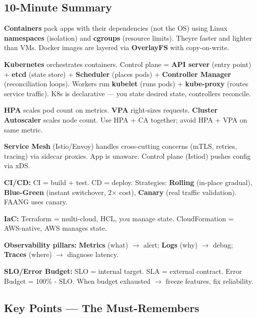 \documentclass[11pt]{article}
\begin{document}
\subsection{10-Minute Summary}\label{10-minute-summary}

\textbf{Containers} pack apps with their dependencies (not the OS) using Linux \textbf{namespaces} (isolation) and \textbf{cgroups} (resource limits). They\textquotesingle re faster and lighter than VMs. Docker images are layered via \textbf{OverlayFS} with copy-on-write.

\textbf{Kubernetes} orchestrates containers. Control plane = \textbf{API server} (entry point) + \textbf{etcd} (state store) + \textbf{Scheduler} (places pods) + \textbf{Controller Manager} (reconciliation loops). Workers run \textbf{kubelet} (runs pods) + \textbf{kube-proxy} (routes service traffic). K8s is declarative --- you state desired state, controllers reconcile.

\textbf{HPA} scales pod count on metrics. \textbf{VPA} right-sizes requests. \textbf{Cluster Autoscaler} scales node count. Use HPA + CA together; avoid HPA + VPA on same metric.

\textbf{Service Mesh} (Istio/Envoy) handles cross-cutting concerns (mTLS, retries, tracing) via sidecar proxies. App is unaware. Control plane (Istiod) pushes config via xDS.

\textbf{CI/CD:} CI = build + test. CD = deploy. Strategies: \textbf{Rolling} (in-place gradual), \textbf{Blue-Green} (instant switchover, 2\(\times\) cost), \textbf{Canary} (real traffic validation). FAANG uses canary.

\textbf{IaC:} Terraform = multi-cloud, HCL, you manage state. CloudFormation = AWS-native, AWS manages state.

\textbf{Observability pillars:} \textbf{Metrics} (what) \(\rightarrow\) alert; \textbf{Logs} (why) \(\rightarrow\) debug; \textbf{Traces} (where) \(\rightarrow\) diagnose latency.

\textbf{SLO/Error Budget:} SLO = internal target. SLA = external contract. Error Budget = 100\% - SLO. When budget exhausted \(\rightarrow\) freeze features, fix reliability.

\subsection{Key Points --- The Must-Remembers}\label{key-points--the-must-remembers}
\end{document}
